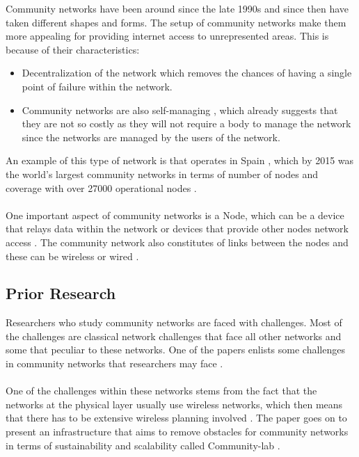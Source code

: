 Community networks have been around since the late 1990s and since then have taken different shapes and forms\cite{8320771}.
The setup of community networks make them more appealing for providing internet access to unrepresented areas.
This is because of their characteristics:
\begin{itemize}
    \item  Decentralization of the network \cite{Selimi:2014:TAD:2723218.2723265} which removes the chances of having a single point of failure within the network.
    \item Community networks are also self-managing \cite{Braem:2013:CRC:2500098.2500108}, which already suggests that they are not so costly as they will not require a body to manage the network since the networks are managed by the users of the network.
\end{itemize}
An example of this type of network is  that operates in Spain \cite{guifi}, which by 2015 was the world's  largest community networks in terms of number of nodes and coverage with over 27000 operational nodes \cite{2015:TOG:2852375.2852741}.
\paragraph{}
One important aspect of community networks is a Node, which can be a device that relays data within the network or devices that provide other nodes network access \cite{8320771}.
The community network also constitutes of links between the nodes and these can be wireless or wired \cite{8320771}.

\subsection{Prior Research}\label{subsec:prior-research}
Researchers who study community networks are faced with challenges.
Most of the challenges are classical network challenges that face all other networks and some that peculiar to these networks.
One of the papers \cite{Braem:2013:CRC:2500098.2500108} enlists some challenges in community networks that researchers may face \cite{Braem:2013:CRC:2500098.2500108}.
\paragraph{}
One of the challenges within these networks stems from the fact that the networks at the physical layer usually use wireless networks, which then means that there has to be extensive wireless planning involved
\cite{Braem:2013:CRC:2500098.2500108}.
The paper goes on to present an infrastructure that aims to remove obstacles for community networks in terms of sustainability and scalability called Community-lab \cite{Braem:2013:CRC:2500098.2500108}.
